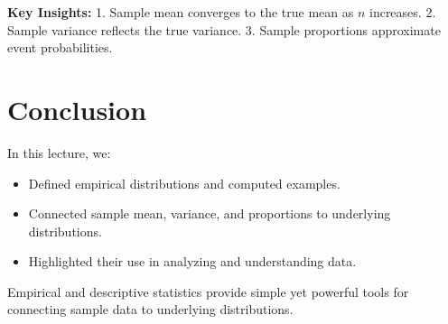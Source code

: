 \documentclass{article}
\begin{document}
\textbf{Key Insights:}
1. Sample mean converges to the true mean as $n$ increases.
2. Sample variance reflects the true variance.
3. Sample proportions approximate event probabilities.

\section*{Conclusion}

In this lecture, we:
\begin{itemize}
  \item Defined empirical distributions and computed examples.
  \item Connected sample mean, variance, and proportions to underlying distributions.
  \item Highlighted their use in analyzing and understanding data.
\end{itemize}

Empirical and descriptive statistics provide simple yet powerful tools for connecting sample data to underlying distributions.
\end{document}
